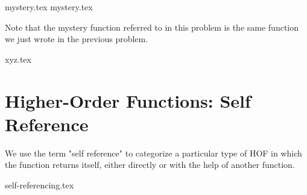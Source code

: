 \documentclass{exam}
\begin{document}
\begin{questions}
{mystery.tex}
{mystery.tex}

\begin{guide}
Note that the mystery function referred to in this problem is the same function we just wrote in the previous problem.
\end{guide}
\newpage
{xyz.tex}
\end{questions}


\newpage
\section{Higher-Order Functions: Self Reference}
We use the term "self reference" to categorize a particular type of HOF in which the function returns itself, 
either directly or with the help of another function.

\begin{questions}
{self-referencing.tex}
\end{questions}

\clearpage
\end{document}
